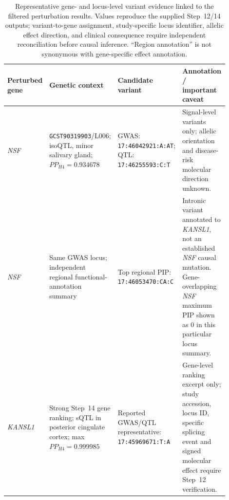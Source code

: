 \documentclass[11pt,a4paper]{article}
\begin{document}
\begin{table}[!htbp]
\centering\footnotesize
\caption{Representative gene- and locus-level variant evidence linked to the filtered perturbation results. Values reproduce the supplied Step~12/14 outputs; variant-to-gene assignment, study-specific locus identifier, allelic effect direction, and clinical consequence require independent reconciliation before causal inference. ``Region annotation'' is not synonymous with gene-specific effect annotation.}
\label{tab:step17_variant_examples}
\begin{tabular}{@{}p{0.13\linewidth}p{0.23\linewidth}p{0.24\linewidth}p{0.30\linewidth}@{}}
\toprule
Perturbed gene & Genetic context & Candidate variant & Annotation / important caveat\\\midrule
\textit{NSF} & \texttt{GCST90319903}/L006; isoQTL, minor salivary gland; $PP_{H4}=0.934678$ & GWAS: \texttt{17:46042921:A:AT}; QTL: \texttt{17:46255593:C:T} & Signal-level variants only; allelic orientation and disease-risk molecular direction unknown.\\
\textit{NSF} & Same GWAS locus; independent regional functional-annotation summary & Top regional PIP: \texttt{17:46053470:CA:C} & Intronic variant annotated to \textit{KANSL1}, not an established \textit{NSF} causal mutation. Gene-overlapping \textit{NSF} maximum PIP shown as 0 in this particular locus summary.\\
\textit{KANSL1} & Strong Step~14 gene ranking; sQTL in posterior cingulate cortex; max $PP_{H4}=0.999985$ & Reported GWAS/QTL representative: \texttt{17:45969671:T:A} & Gene-level ranking excerpt only; study accession, locus ID, specific splicing event and signed molecular effect require Step~12 verification.\\
\bottomrule
\end{tabular}
\end{table}
\end{document}
